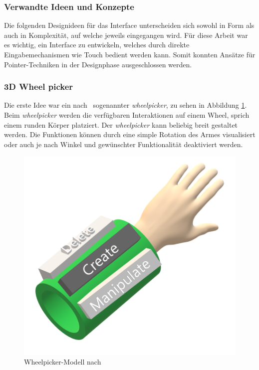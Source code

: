 \subsubsection{Verwandte Ideen und Konzepte}
Die folgenden Designideen für das Interface unterscheiden sich sowohl in Form als auch in Komplexität, auf welche jeweils eingegangen wird. Für diese Arbeit war es wichtig, ein Interface zu entwickeln, welches durch direkte Eingabemechanismen wie Touch bedient werden kann. Somit konnten Ansätze für Pointer-Techniken in der Designphase ausgeschlossen werden.

\subsubsection*{3D Wheel picker}
\noindent Die erste Idee war ein nach~\cite{wheelpickerpiemenu} sogenannter \textit{wheelpicker}, zu sehen in Abbildung \ref{fig:wheelpicker1}. Beim \textit{wheelpicker} werden die verfügbaren Interaktionen auf einem Wheel, sprich einem runden Körper platziert. Der \textit{wheelpicker} kann beliebig breit gestaltet werden. Die Funktionen können durch eine simple Rotation des Armes visualisiert oder auch je nach Winkel und gewünschter Funktionalität deaktiviert werden.

\begin{figure}[h]
\captionsetup{width=.7\linewidth}
\includegraphics[scale=0.5]{Bilder/Hauptteil/konzept8}
\centering
\caption{Wheelpicker-Modell nach~\cite[p.~33]{wheelpickerpiemenu}}
\label{fig:wheelpicker1}
\end{figure}

